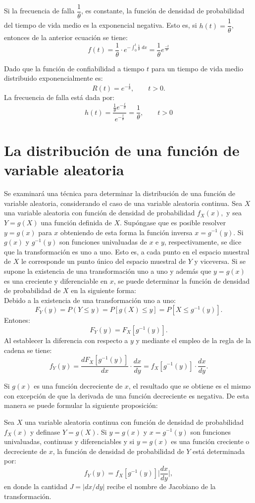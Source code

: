 Si la frecuencia de falla $\dfrac{1}{\theta}$, es constante, la función de densidad de probabilidad del tiempo de vida medio es la exponencial negativa. Esto es, si $h(t)=\dfrac{1}{\theta}$, entonces de la anterior ecuación se tiene:
$$f(t)=\dfrac{1}{\theta}\cdot e^{-\int_0^t \frac{1}{\theta}\; dx} = \dfrac{1}{\theta}e^{\frac{-t}{\theta}}$$

Dado que la función de confiabilidad a tiempo $t$ para un tiempo de vida medio distribuido exponencialmente es:
$$R(t)=e^{-\frac{t}{\theta}},\qquad t>0.$$
La frecuencia de falla está dada por:
$$h(t)=\dfrac{\frac{1}{\theta}e^{-\frac{t}{\theta}}}{e^{-\frac{t}{\theta}}}=\dfrac{1}{\theta},\qquad t>0$$


\section{La distribución de una función de variable aleatoria}
Se examinará una técnica para determinar la distribución de una función de variable aleatoria, considerando el caso de una variable aleatoria continua. Sea $X$ una variable aleatoria con función de densidad de probabilidad $f_X(x),$ y sea $Y=g(X)$ una función definida de $X$. Supóngase que es posible resolver $y=g(x)$ para $x$ obteniendo de esta forma la función inversa $x=g^{-1}(y)$. Si $g(x)$ y $g^{-1}(y)$ son funciones univaluadas de $x$ e $y$, respectivamente, se dice que la transformación es uno a uno. Esto es, a cada punto en el espacio muestral de $X$ le corresponde un punto único del espacio muestral de $Y$ y viceversa. Si se supone la existencia de una transformación uno a uno y además que $y=g(x)$ es una creciente y diferenciable en $x$, se puede determinar la función de densidad de probabilidad de $X$ en la siguiente forma:\\
Debido a la existencia de una transformación uno a uno:
$$F_Y(y)=P(Y\leq y)=P\left[g(X)\leq y\right] = P\left[X\leq g^{-1}(y)\right].$$
Entones:
$$F_Y(y)=F_X\left[g^{-1}(y)\right].$$
Al establecer la diferencia con respecto a $y$ y mediante el empleo de la regla de la cadena se tiene:
$$f_Y(y)=\dfrac{dF_X\left[g^{-1}(y)\right]}{dx}\cdot \dfrac{dx}{dy}=f_X\left[g^{-1}(y)\right]\cdot \dfrac{dx}{dy}.$$

Si $g(x)$ es una función decreciente de $x$, el resultado que se obtiene es el mismo con excepción de que la derivada de una función decreciente es negativa. De esta manera se puede formular la siguiente proposición:\\

\begin{teo}
    Sea $X$ una variable aleatoria continua con función de densidad de probabilidad $f_X(x)$ y definase $Y=g(X)$. Si $y=g(x)$ y $x=g^{-1}(y)$ son funciones univaluadas, continuas y diferenciables y si $y=g(x)$ es una función creciente o decreciente de $x$, la función de densidad de probabilidad de $Y$ está determinada por:
    $$f_Y(y)=f_X\left[g^{-1}(y)\right]\bigg|\dfrac{dx}{dy}\bigg|,$$
    en donde la cantidad $J=| dx/dy |$ recibe el nombre de Jacobiano de la transformación.
\end{teo}


